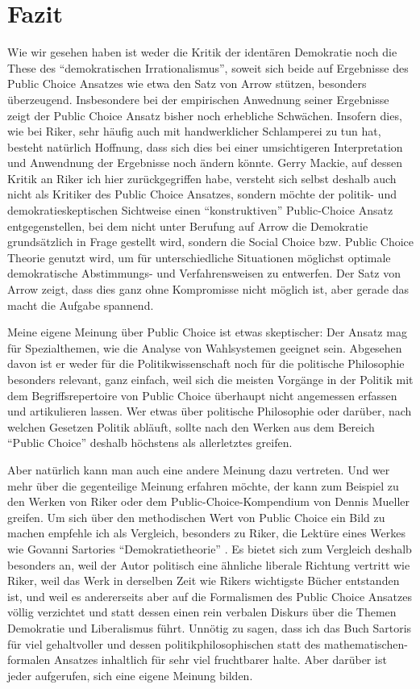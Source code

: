 \section{Fazit}

Wie wir gesehen haben ist weder die Kritik der identären Demokratie noch die
These des ``demokratischen Irrationalismus'', soweit sich beide auf Ergebnisse
des Public Choice Ansatzes wie etwa den Satz von Arrow stützen, besonders
überzeugend. Insbesondere bei der empirischen Anwednung seiner Ergebnisse zeigt
der Public Choice Ansatz bisher noch erhebliche Schwächen. Insofern dies, wie
bei Riker, sehr häufig auch mit handwerklicher Schlamperei zu tun hat, besteht
natürlich Hoffnung, dass sich dies bei einer umsichtigeren Interpretation und
Anwendnung der Ergebnisse noch ändern könnte. Gerry Mackie, auf dessen Kritik
an Riker ich hier zurückgegriffen habe, versteht sich selbst deshalb auch nicht
als Kritiker des Public Choice Ansatzes, sondern möchte der politik- und
demokratieskeptischen Sichtweise einen ``konstruktiven'' Public-Choice Ansatz
entgegenstellen, bei dem nicht unter Berufung auf Arrow die Demokratie
grundsätzlich in Frage gestellt wird, sondern die Social Choice bzw. Public
Choice Theorie genutzt wird, um für unterschiedliche Situationen möglichst
optimale demokratische Abstimmungs- und Verfahrensweisen zu entwerfen. Der Satz
von Arrow zeigt, dass dies ganz ohne Kompromisse nicht möglich ist, aber gerade
das macht die Aufgabe spannend.

Meine eigene Meinung über Public Choice ist etwas skeptischer: Der Ansatz mag
für Spezialthemen, wie die Analyse von Wahlsystemen geeignet sein. Abgesehen
davon ist er weder für die Politikwissenschaft noch für die politische
Philosophie besonders relevant, ganz einfach, weil sich die meisten Vorgänge in
der Politik mit dem Begriffsrepertoire von Public Choice überhaupt nicht
angemessen erfassen und artikulieren lassen. Wer etwas über politische
Philosophie oder darüber, nach welchen Gesetzen Politik abläuft, sollte nach
den Werken aus dem Bereich ``Public Choice'' deshalb höchstens als allerletztes
greifen. 

Aber natürlich kann man auch eine andere Meinung dazu vertreten. Und wer mehr
über die gegenteilige Meinung erfahren möchte, der kann zum Beispiel zu den
Werken von Riker \cite[]{riker:1982} oder dem Public-Choice-Kompendium von Dennis
Mueller\cite[]{mueller:2003} greifen. Um sich über den methodischen Wert von
Public Choice ein Bild zu machen empfehle ich als Vergleich, besonders zu Riker,
die Lektüre eines Werkes wie Govanni Sartories ``Demokratietheorie''
\cite[]{sartori:1987}. Es bietet sich zum Vergleich deshalb besonders an, weil
der Autor politisch eine ähnliche liberale Richtung vertritt wie Riker, weil das
Werk in derselben Zeit wie Rikers wichtigste Bücher entstanden ist, und weil es
andererseits aber auf die Formalismen des Public Choice Ansatzes völlig
verzichtet und statt dessen einen rein verbalen Diskurs über die Themen
Demokratie und Liberalismus führt. Unnötig zu sagen, dass ich das Buch Sartoris
für viel gehaltvoller und dessen politikphilosophischen statt des
mathematischen-formalen Ansatzes inhaltlich für sehr viel fruchtbarer halte. Aber
darüber ist jeder aufgerufen, sich eine eigene Meinung bilden.
